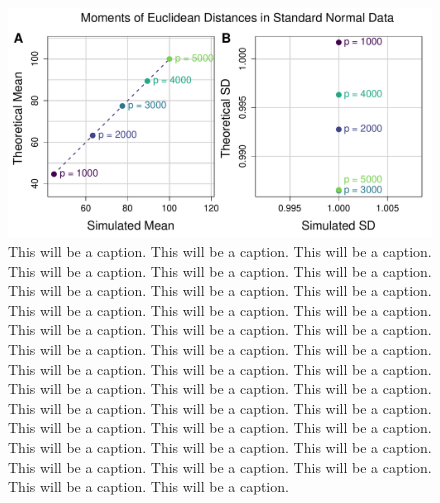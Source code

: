 \documentclass[10pt,letterpaper]{article}\usepackage[]{graphicx}\usepackage[]{color}
\begin{document}
\begin{figure}[H]
	\includegraphics[width=\textwidth]{compared_moments_normal_euclidean_standard.pdf}
	\caption{This will be a caption. This will be a caption. This will be a caption. This will be a caption. This will be a caption. This will be a caption. This will be a caption. This will be a caption. This will be a caption. This will be a caption. This will be a caption. This will be a caption. This will be a caption. This will be a caption. This will be a caption. This will be a caption. This will be a caption. This will be a caption. This will be a caption. This will be a caption. This will be a caption. This will be a caption. This will be a caption. This will be a caption. This will be a caption. This will be a caption. This will be a caption. This will be a caption. This will be a caption. This will be a caption. This will be a caption. This will be a caption. This will be a caption. This will be a caption. This will be a caption. This will be a caption. This will be a caption. This will be a caption.}
\end{figure}
\end{document}

